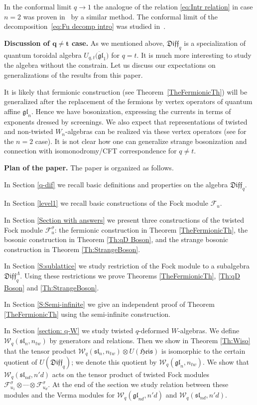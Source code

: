 \documentclass[pdftex]{sigma}
\numberwithin{equation}{section}
\theoremstyle{definition}
\newcommand{\qD}{\mathfrak{Diff}_q}
\newcommand{\UH}{\otimes U(\mathfrak{Heis})}
\begin{document}
In the conformal limit $q\rightarrow 1$ the analogue of the relation \eqref{eq:Intr relation} in case $n=2$ was proven in~\cite{BS:2016:2} by a similar method. The conformal limit of the decomposition~\eqref{eq:Fu decomp intro} was studied in~\cite{BGMtw}.

{\bf Discussion of $\boldsymbol{q\neq t}$ case.} As we mentioned above, $\qD$ is a specialization of quantum toroidal algebra $U_{q,t}\big(\ddot{\mathfrak{gl}}_1\big)$ for $q=t$. It is much more interesting to study the algebra without the constrain. Let us discuss our expectations on generalizations of the results from this paper.

It is likely that fermionic construction (see Theorem~\ref{TheFermionicTh}) will be generalized after the replacement of the fermions by vertex operators of quantum affine $\mathfrak{gl}_n$. Hence we have bosonization, expressing the currents in terms of exponents dressed by screenings. We also expect that representations of twisted and non-twisted $W_n$-algebras can be realized via these vertex operators (see \cite{BG} for the $n=2$ case). It is not clear how one can generalize strange bosonization and connection with isomonodromy/CFT correspondence for $q \neq t$.

{\bf Plan of the paper.} The paper is organized as follows.

In Section \ref{q-dif} we recall basic definitions and properties on the algebra $\qD$.

In Section \ref{level1} we recall basic constructions of the Fock module $\mathcal{F}_u$.

In Section \ref{Section with answers} we present three constructions of the twisted Fock module $\mathcal{F}_u^{\sigma}$: the fermionic construction in Theorem \ref{TheFermionicTh}, the bosonic construction in Theorem \ref{Th:qD Boson}, and the strange bosonic construction in Theorem \ref{Th:StrangeBoson}.

In Section \ref{S:sublattice} we study restriction of the Fock module to a subalgebra $\qD^{\Lambda}$. Using these restrictions we prove Theorems \ref{TheFermionicTh}, \ref{Th:qD Boson} and \ref{Th:StrangeBoson}.

In Section \ref{S:Semi-infinite} we give an independent proof of Theorem \ref{TheFermionicTh} using the semi-infinite construction.

In Section \ref{section: q-W} we study twisted $q$-deformed $W$-algebras. We define $\mathcal{W}_q(\mathfrak{sl}_n,n_{tw})$ by generators and relations. Then we show in Theorem \ref{Th:Wiso} that the tensor product $\mathcal{W}_q(\mathfrak{sl}_n,n_{tw})\UH$ is isomorphic to the certain quotient of $U(\qD)$; we denote this quotient by $\mathcal{W}_q(\mathfrak{gl}_n,n_{tw})$. We show that $\mathcal{W}_q(\mathfrak{sl}_{nd},n'd)$ acts on the tensor product of twisted Fock modules ${\mathcal{F}^{\sigma}_{u_1} \otimes \cdots \otimes \mathcal{F}_{u_d}^{\sigma}}$. At the end of the section we study relation between these modules and the Verma modules for $\mathcal{W}_q(\mathfrak{gl}_{nd},n'd)$ and $\mathcal{W}_q(\mathfrak{sl}_{nd},n'd)$.
\end{document}
